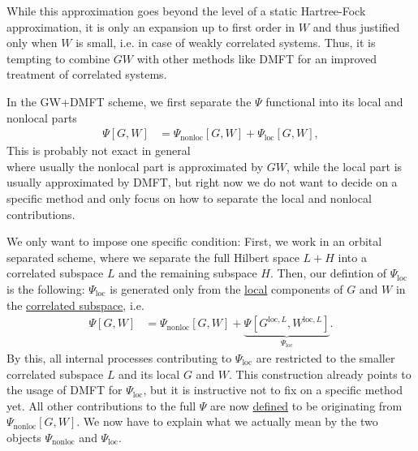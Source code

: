 \documentclass[12pt,a4paper]{scrartcl}
\numberwithin{equation}{section}
\newcommand{\cng}[1]{{\color{red}#1}}
\begin{document}
While this approximation goes beyond the level of a static Hartree-Fock approximation,
it is only an expansion up to first order in $W$ and thus justified only when $W$ is
small, i.e. in case of weakly correlated systems. Thus, it is tempting to combine
$GW$ with other methods like DMFT for an improved treatment of correlated systems.

\bigskip

In the GW+DMFT scheme, we first separate the $\Psi$ functional into
its local and nonlocal parts
\begin{align}
\Psi[G,W] &= \Psi_{\mathrm{nonloc}}[G,W] + \Psi_{\mathrm{loc}}[G,W],
\end{align}
\cng{This is probably not exact in general}\\
where usually the nonlocal part is approximated by $GW$, while the local part is 
usually approximated by DMFT, but right now we do not want to decide on a 
specific method and only focus on how to separate the local and nonlocal 
contributions.

We only want to impose one specific condition: First, we work in an orbital separated scheme,
where we separate the full Hilbert space $L+H$ into a correlated subspace $L$ and the remaining subspace $H$.
Then, our defintion of $\Psi_{\mathrm{loc}}$ is the following: $\Psi_{\mathrm{loc}}$ is generated only from the \underline{local}
components of $G$ and $W$ in the \underline{correlated subspace}, i.e.
\begin{align}
\Psi[G,W] &= \Psi_{\mathrm{nonloc}}[G,W] + \underbrace{\Psi_{}[G^{\mathrm{loc},L},W^{\mathrm{loc},L}]}_{\Psi_{\mathrm{loc}}}.
\label{eq:psi_separation_nonloc_loc}
\end{align}
By this, all internal processes contributing to $\Psi_{\mathrm{loc}}$ 
are restricted to the smaller correlated subspace $L$ and its local $G$ and $W$.
This construction already points to the usage of DMFT for $\Psi_{\mathrm{loc}}$, but it is instructive
not to fix on a specific method yet.
% 
% 
% 
% 
% 
% 
All other contributions to the full $\Psi$ are now \underline{defined} to be originating from $\Psi_{\mathrm{nonloc}}[G,W]$.
We now have to explain what we actually mean by the two objects 
$\Psi_{\mathrm{nonloc}}$ and $\Psi_{\mathrm{loc}}$.
\end{document}
